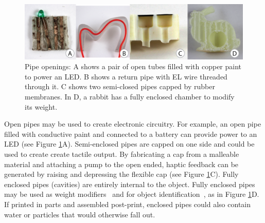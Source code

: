 \begin{figure}[t]
\centering
    \includegraphics[width=1.0\columnwidth]{figures/types.png}
\caption{Pipe openings: A shows a pair of open tubes filled with copper paint to power an LED.  B shows a return pipe with EL wire threaded through it.  C shows two semi-closed pipes capped by rubber membranes.  In D, a rabbit has a fully enclosed chamber to modify its weight.}
\label{fig:openings}
\end{figure}

Open pipes may be used to create electronic circuitry.  For example, an open pipe filled with conductive paint and connected to a battery can provide power to an LED (see Figure \ref{fig:openings}A).
%
Semi-enclosed pipes are capped on one side and could be used to create create tactile output. By fabricating a cap from a malleable material and attaching a pump to the open ended, haptic feedback can be generated by raising and depressing the flexible cap (see Figure \ref{fig:openings}C).
%
Fully enclosed pipes (cavities) are entirely internal to the object.  Fully enclosed pipes may be used as weight modifiers~\cite{Prevost-makeitstand} and for object identification~\cite{Willis-infrastructs}, as in Figure \ref{fig:openings}D.  If printed in parts and assembled post-print, enclosed pipes could also contain water or particles that would otherwise fall out.

